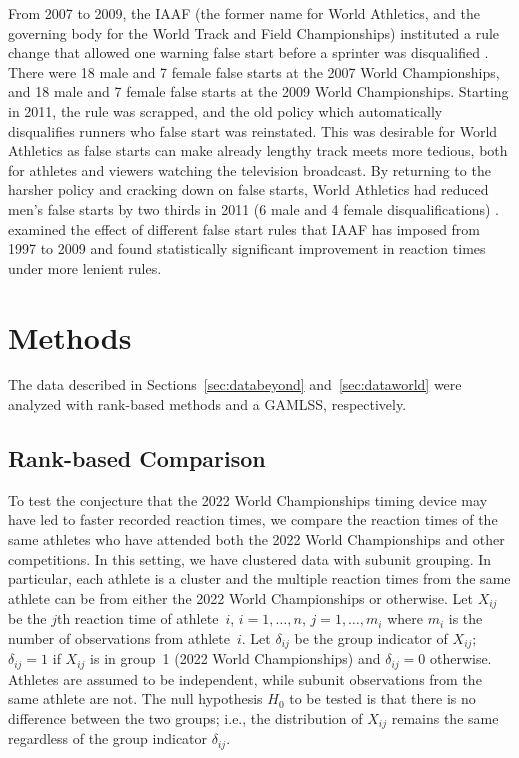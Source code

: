 \documentclass[12pt, letterpaper]{article}
\begin{document}
From 2007 to 2009, the IAAF (the former name for World Athletics, and the 
governing body for the World Track and Field Championships) instituted a rule 
change that allowed one warning false start before a sprinter was disqualified 
\citep{iaaf2009falsestart}. There were 18 male and 7 female false starts at the 
2007 World Championships, and 18 male and 7 female false starts at the 2009 World 
Championships. Starting in 2011, the rule was scrapped, and the old policy which
automatically disqualifies runners who false start was reinstated. This was 
desirable for World Athletics as false starts can make already lengthy track 
meets more tedious, both for athletes and viewers watching the television 
broadcast. By returning to the harsher policy and cracking down on false starts,
World Athletics had reduced men's false starts by two thirds in 2011 (6 male and
4 female disqualifications) \citep{iaaf2009falsestart}. \citet{haugen2013effect}
examined the effect of different false start rules that IAAF has imposed from 
1997 to 2009 and found statistically significant improvement in reaction times 
under more lenient rules.



\section{Methods} \label{sec:methods}

The data described in Sections~\ref{sec:databeyond} and~\ref{sec:dataworld} were
analyzed with rank-based methods and a GAMLSS, respectively.


\subsection{Rank-based Comparison}\label{sec:rank}


To test the conjecture that the 2022 World Championships timing device may have 
led to faster recorded reaction times, we compare the reaction times of the same
athletes who have attended both the 2022 World Championships and other 
competitions. 
In this setting, we have clustered data with subunit grouping. In particular,
each athlete is a cluster and the multiple reaction times from the same athlete
can be from either the 2022 World Championships or otherwise.
Let $X_{ij}$ be the $j$th reaction time of athlete~$i$, $i = 1, \ldots, n$,
$j = 1, \ldots, m_i$ where $m_i$ is the number of observations from
athlete~$i$. Let $\delta_{ij}$ be the group indicator of $X_{ij}$; $\delta_{ij}
= 1$ if $X_{ij}$ is in group~1 (2022 World Championships) and $\delta_{ij} = 0$ 
otherwise. Athletes are
assumed to be independent, while subunit observations from the same athlete are
not. The null hypothesis $H_0$ to be tested is that there is no difference
between the two groups; i.e., the distribution of $X_{ij}$ remains the same
regardless of the group indicator $\delta_{ij}$.
\end{document}
